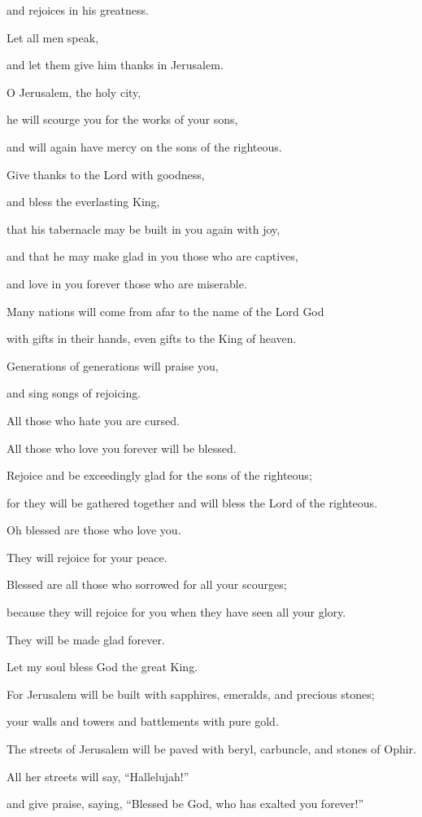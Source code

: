 {\par }{\QB and rejoices in his greatness.
\par }{\Q {}Let all men speak,
\par }{\QB and let them give him thanks in Jerusalem.
\par }{\Q {}O Jerusalem, the holy city,
\par }{\QB he will scourge you for the works of your sons,
\par }{\QB and will again have mercy on the sons of the righteous.
\par }{\Q {}Give thanks to the Lord with goodness,
\par }{\QB and bless the everlasting King,
\par }{\Q that his tabernacle may be built in you again with joy,
\par }{\QB and that he may make glad in you those who are captives,
\par }{\QB and love in you forever those who are miserable.
\par }{\Q {}Many nations will come from afar to the name of the Lord God
\par }{\QB with gifts in their hands, even gifts to the King of heaven.
\par }{\Q Generations of generations will praise you,
\par }{\QB and sing songs of rejoicing.
\par }{\Q {}All those who hate you are cursed.
\par }{\QB All those who love you forever will be blessed.
\par }{\Q {}Rejoice and be exceedingly glad for the sons of the righteous;
\par }{\QB for they will be gathered together and will bless the Lord of the righteous.
\par }{\Q {}Oh blessed are those who love you.
\par }{\QB They will rejoice for your peace.
\par }{\Q Blessed are all those who sorrowed for all your scourges;
\par }{\QB because they will rejoice for you when they have seen all your glory.
\par }{\Q They will be made glad forever.
\par }{\QB {}Let my soul bless God the great King.
\par }{\Q {}For Jerusalem will be built with sapphires, emeralds, and precious stones;
\par }{\QB your walls and towers and battlements with pure gold.
\par }{\Q {}The streets of Jerusalem will be paved with beryl, carbuncle, and stones of Ophir.
\par }{\QB {}All her streets will say, “Hallelujah!”
\par }{\QB and give praise, saying, “Blessed be God, who has exalted you forever!”

}
